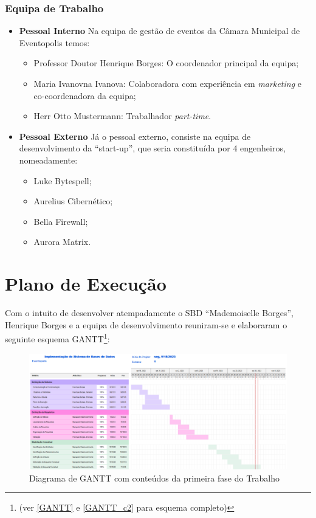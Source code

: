 \documentclass[a4paper,12pt]{scrreprt}
\begin{document}
             \subsubsection{Equipa de Trabalho}
             \begin{itemize}
                 \item{\textbf{Pessoal Interno}}
                   Na equipa de gest\~ao de eventos da C\^amara Municipal de Eventopolis temos:
                   \begin{itemize}
                     \item{Professor Doutor Henrique Borges:} O coordenador principal da equipa;
                     \item{Maria Ivanovna Ivanova:} Colaboradora com experi\^encia em \textit{marketing} e co-coordenadora
                       da equipa;
                     \item{Herr Otto Mustermann:} Trabalhador \textit{part-time}.
                   \end{itemize}
                 \item{\textbf{Pessoal Externo}}
                   Já o pessoal externo, consiste na equipa de desenvolvimento da ``start-up'',
                   que seria constituída por 4 engenheiros, nomeadamente:
                   \begin{itemize}
                     \item Luke Bytespell;
                     \item Aurelius Cibern\'etico;
                     \item Bella Firewall;
                     \item Aurora Matrix.
                   \end{itemize}
             \end{itemize}
        \section{Plano de Execu\c{c}\~ao}
             Com o intuito de desenvolver atempadamente o SBD ``Mademoiselle Borges'', Henrique Borges e a equipa de desenvolvimento
              reuniram-se e elaboraram o seguinte esquema GANTT\footnote{(ver \ref{GANTT} e \ref{GANTT_c2} para esquema completo)}:
        \newpage
        \begin{figure}[h]
            \centering
            \includegraphics[width=6.2in]{images/GANTT_c1.png}
            \caption{Diagrama de GANTT com conteúdos da primeira fase do Trabalho}
        \end{figure}
    
\end{document}

